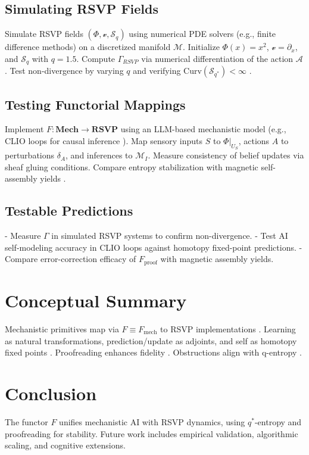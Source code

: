 \documentclass{article}
\theoremstyle{plain}
\theoremstyle{definition}
\begin{document}
\subsection{Simulating RSVP Fields}
Simulate RSVP fields $(\Phi, \mathcal{v}, \mathcal{S}_q)$ using numerical PDE solvers (e.g., finite difference methods) on a discretized manifold $\mathcal{M}$. Initialize $\Phi(x) = x^2$, $\mathcal{v} = \partial_x$, and $\mathcal{S}_q$ with $q=1.5$. Compute $\Gamma_{RSVP}$ via numerical differentiation of the action $\mathcal{A}$. Test non-divergence by varying $q$ and verifying $\text{Curv}(\mathcal{S}_{q^*}) < \infty$ \cite{Soares2024}.

\subsection{Testing Functorial Mappings}
Implement $F: \mathbf{Mech} \to \mathbf{RSVP}$ using an LLM-based mechanistic model (e.g., CLIO loops for causal inference \cite{Bennett2025}). Map sensory inputs $S$ to $\Phi|_{U_S}$, actions $A$ to perturbations $\delta_A$, and inferences to $\mathcal{M}_I$. Measure consistency of belief updates via sheaf gluing conditions. Compare entropy stabilization with magnetic self-assembly yields \cite{Liang2025}.

\subsection{Testable Predictions}
- Measure $\Gamma$ in simulated RSVP systems to confirm non-divergence.
- Test AI self-modeling accuracy in CLIO loops against homotopy fixed-point predictions.
- Compare error-correction efficacy of $F_\text{proof}$ with magnetic assembly yields.

\section{Conceptual Summary}
Mechanistic primitives map via $F \equiv F_\text{mech}$ to RSVP implementations \cite{Bennett2025,Spivak2014}. Learning as natural transformations, prediction/update as adjoints, and self as homotopy fixed points \cite{Awodey2010}. Proofreading enhances fidelity \cite{Liang2025}. Obstructions align with q-entropy \cite{Soares2024,Tsallis1988}.

\section{Conclusion}
The functor $F$ unifies mechanistic AI with RSVP dynamics, using $q^*$-entropy and proofreading for stability. Future work includes empirical validation, algorithmic scaling, and cognitive extensions.
\end{document}
